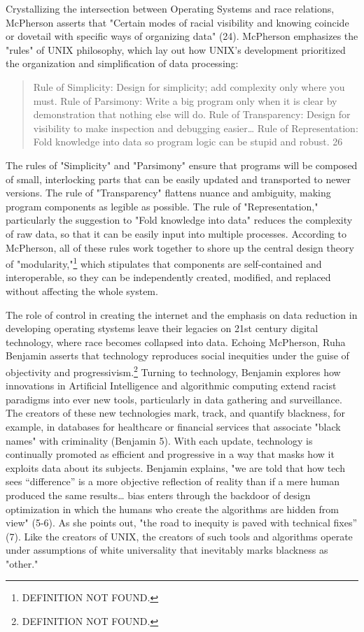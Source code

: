 \documentclass[11pt]{article}
\begin{document}
Crystallizing the intersection between Operating Systems and race
relations, McPherson asserts that "Certain modes of racial visibility
and knowing coincide or dovetail with specific ways of organizing
data" (24). McPherson emphasizes the "rules" of UNIX philosophy, which
lay out how UNIX's development prioritized the organization and
simplification of data processing:
\begin{quote}
Rule of Simplicity: Design for simplicity; add complexity only where
you must. Rule of Parsimony: Write a big program only when it is clear
by demonstration that nothing else will do. Rule of Transparency:
Design for visibility to make inspection and debugging easier\ldots{} Rule
of Representation: Fold knowledge into data so program logic can be
stupid and robust. 26
\end{quote}
The rules of "Simplicity" and "Parsimony" ensure that programs will be
composed of small, interlocking parts that can be easily updated and
transported to newer versions. The rule of "Transparency" flattens
nuance and ambiguity, making program components as legible as
possible. The rule of "Representation," particularly the suggestion to
"Fold knowledge into data" reduces the complexity of raw data, so that
it can be easily input into multiple processes. According to
McPherson, all of these rules work together to shore up the central
design theory of "modularity,"\footnote{DEFINITION NOT FOUND.} which stipulates that components
are self-contained and interoperable, so they can be independently
created, modified, and replaced without affecting the whole system.

The role of control in creating the internet and the emphasis on data
reduction in developing operating stystems leave their legacies on
21st century digital technology, where race becomes collapsed into
data. Echoing McPherson, Ruha Benjamin asserts that technology
reproduces social inequities under the guise of objectivity and
progressivism.\footnote{DEFINITION NOT FOUND.} Turning to technology, Benjamin explores how
innovations in Artificial Intelligence and algorithmic computing
extend racist paradigms into ever new tools, particularly in data
gathering and surveillance. The creators of these new technologies
mark, track, and quantify blackness, for example, in databases for
healthcare or financial services that associate "black names" with
criminality (Benjamin 5). With each update, technology is continually
promoted as efficient and progressive in a way that masks how it
exploits data about its subjects. Benjamin explains, "we are told that
how tech sees “difference” is a more objective reflection of reality
than if a mere human produced the same results\ldots{} bias enters through
the backdoor of design optimization in which the humans who create the
algorithms are hidden from view" (5-6). As she points out, "the road
to inequity is paved with technical fixes” (7). Like the creators of
UNIX, the creators of such tools and algorithms operate under
assumptions of white universality that inevitably marks blackness as
"other."
\end{document}
